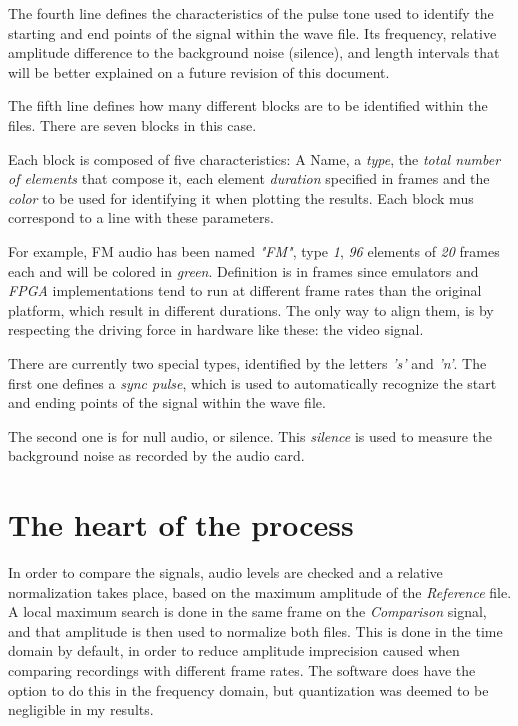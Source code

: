 \documentclass[10pt,a4paper]{report}
\begin{document}
The fourth line defines the characteristics of the pulse tone used to identify the starting and end points of the signal within the wave file. Its frequency, relative amplitude difference to the background noise (silence), and length intervals that will be better explained on a future revision of this document.

The fifth line defines how many different blocks are to be identified within the files. There are seven blocks in this case.

Each block is composed of five characteristics: A Name, a \textit{type}, the \textit{total number of elements} that compose it, each element \textit{duration} specified in frames and the \textit{color} to be used for identifying it when plotting the results. Each block mus correspond to a line with these parameters.

For example, FM audio has been named \textit{"FM"}, type \textit{1}, \textit{96} elements of \textit{20} frames each and will be colored in \textit{green}. Definition is in frames since emulators and \textit{FPGA} implementations tend to run at different frame rates than the original platform, which result in different durations. The only way to align them, is by respecting the driving force in hardware like these: the video signal.

There are currently two special types, identified by the letters \textit{'s'} and \textit{'n'}. The first one defines a \textit{sync pulse}, which is used to automatically recognize the start and ending points of the signal within the wave file. 

The second one is for null audio, or silence. This \textit{silence} is used to measure the background noise as recorded by the audio card. 

\section{The heart of the process}

In order to compare the signals, audio levels are checked and a relative normalization takes place, based on the maximum amplitude of the \textit{Reference} file. A local maximum search is done in the same frame on the \textit{Comparison} signal, and that amplitude is then used to normalize both files. This is done in the time domain by default, in order to reduce amplitude imprecision caused when comparing recordings with different frame rates. The software does have the option to do this in the frequency domain, but quantization was deemed to be negligible in my results.
\end{document}
